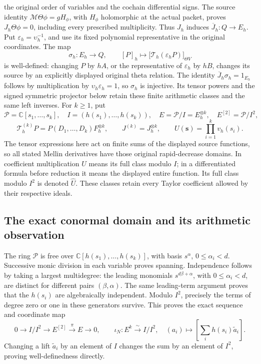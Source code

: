 the original order of variables and the cochain differential signs.
The source identity \(\mathcal M\Theta\phi=gH_\phi\), with
\(H_\phi\) holomorphic at the actual packet, proves
\(J_h\Theta\phi=0\), including every prescribed multiplicity.
Thus \(J_h\) induces \(\overline J_h:Q\to E_h\).
Put \(\varepsilon_h=\upsilon_h^{-1}\), and use its fixed polynomial
representative in the original coordinates. The map
\[
\sigma_h:E_h\longrightarrow Q,\qquad
[P]_h\longmapsto
\bigl[\mathcal T_h(\varepsilon_h P)\bigr]_{\Theta V}
\]
is well-defined: changing \(P\) by \(hA\), or the representative of
\(\varepsilon_h\) by \(hB\), changes its source by an explicitly
displayed original theta relation. The identity
\(\overline J_h\sigma_h=1_{E_h}\) follows by multiplication by
\(\upsilon_h\varepsilon_h=1\), so \(\sigma_h\) is injective.
Its tensor powers and the signed symmetric projector below retain
these finite arithmetic classes and the same left inverses.
For \(k\ge1\), put
\[
\mathcal P=\mathbb C[s_1,\ldots,s_k],\quad
I=(h(s_1),\ldots,h(s_k)),\quad
E=\mathcal P/I=E_h^{\otimes k},\quad E^{[2]}=\mathcal P/I^2,
\]
\[
\mathcal T_h^{(k)}P=P(D_1,\ldots,D_k)F_h^{\otimes k},\qquad
J^{(k)}=J_h^{\otimes k},\qquad
U(\boldsymbol s)=\prod_{i=1}^k v_h(s_i).
\]
The tensor expressions here act on finite sums of the displayed source
functions, so all stated Mellin derivatives have those original
rapid-decrease domains. In coefficient multiplication \(U\) means its
full class modulo \(I\); in a differentiated formula before reduction
it means the displayed entire function. Its full class modulo \(I^2\)
is denoted \(\widehat U\). These classes retain every Taylor
coefficient allowed by their respective ideals.

\subsection{The exact conormal domain and its arithmetic observation}

The ring \(\mathcal P\) is free over
\(\mathbb C[h(s_1),\ldots,h(s_k)]\), with basis
\(s^\alpha\), \(0\le\alpha_i<d\).
Successive monic division in each variable proves spanning.
Independence follows by taking a largest multidegree: the leading
monomials \(s^{d\beta+\alpha}\), with \(0\le\alpha_i<d\), are
distinct for different pairs \((\beta,\alpha)\).
The same leading-term argument proves that the \(h(s_i)\) are
algebraically independent. Modulo \(I^2\), precisely the terms of
degree zero or one in these generators survive. This proves the exact
sequence and coordinate map
\[
0\longrightarrow I/I^2\longrightarrow E^{[2]}
\xrightarrow{\pi}E\longrightarrow0,\qquad
\iota_N:E^k\xrightarrow{\sim}I/I^2,\quad
(a_i)\longmapsto\left[\sum_i h(s_i)\widetilde a_i\right].
\]
Changing a lift \(\widetilde a_i\) by an element of \(I\) changes the
sum by an element of \(I^2\), proving well-definedness directly.

